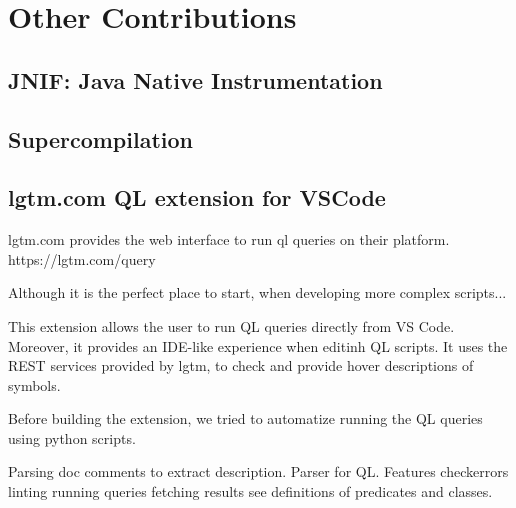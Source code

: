 
\chapter{Other Contributions}

\section{JNIF: Java Native Instrumentation}

\section{Supercompilation}

\section{lgtm.com QL extension for VSCode}

lgtm.com provides the web interface to run ql queries on their platform.
https://lgtm.com/query

Although it is the perfect place to start, when developing more complex scripts...

This extension allows the user to run QL queries directly from VS Code.
Moreover, it provides an IDE-like experience when editinh QL scripts.
It uses the REST services provided by lgtm, to check and provide hover descriptions of symbols.

Before building the extension, we tried to automatize running the QL queries using python
scripts.

Parsing doc comments to extract description.
Parser for QL.
Features
checkerrors linting
running queries
fetching results
see definitions of predicates and classes.
